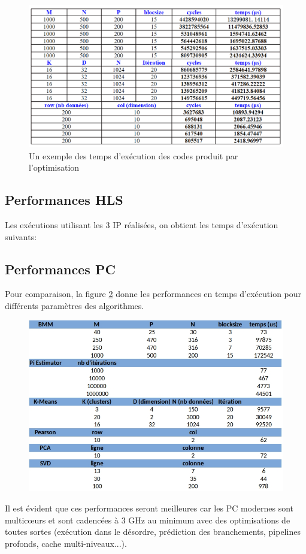 \documentclass[12pt,a4paper]{article}
\begin{document}
\begin{figure}[H]
	\centering
	\includegraphics[width=\linewidth]{soft/screenshot007}
	\caption{Un exemple des temps d'exécution des codes produit par l'optimisation}
	\label{fig:screenshot007}
\end{figure}


\subsection{Performances HLS}
Les exécutions utilisant les 3 IP réalisées, on obtient les temps d'exécution  suivants:

\subsection{Performances PC}
Pour comparaison, la figure \ref{fig:timepc} donne les performances en temps d'exécution pour différents paramètres des algorithmes.
\begin{figure}[H]
	\centering
	\includegraphics[width=0.8\linewidth]{soft/time_pc}
	\caption{}
	\label{fig:timepc}
\end{figure}
Il est évident que ces performances seront meilleures car les PC modernes sont multicœurs et sont cadencées à 3 GHz au minimum avec des optimisations de toutes sortes (exécution dans le désordre, prédiction des branchements, pipelines profonds, cache multi-niveaux...).
\end{document}
